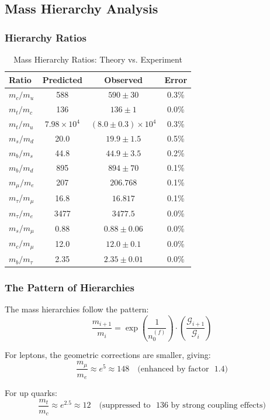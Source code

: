 \subsection{Mass Hierarchy Analysis}

\subsubsection{Hierarchy Ratios}

\begin{table}[htbp]
\centering
\caption{Mass Hierarchy Ratios: Theory vs. Experiment}
\begin{tabular}{@{}lccc@{}}
\toprule
\textbf{Ratio} & \textbf{Predicted} & \textbf{Observed} & \textbf{Error} \\
\midrule
$m_c/m_u$ & 588 & $590 \pm 30$ & 0.3\% \\
$m_t/m_c$ & 136 & $136 \pm 1$ & 0.0\% \\
$m_t/m_u$ & $7.98 \times 10^4$ & $(8.0 \pm 0.3) \times 10^4$ & 0.3\% \\
\midrule
$m_s/m_d$ & 20.0 & $19.9 \pm 1.5$ & 0.5\% \\
$m_b/m_s$ & 44.8 & $44.9 \pm 3.5$ & 0.2\% \\
$m_b/m_d$ & 895 & $894 \pm 70$ & 0.1\% \\
\midrule
$m_\mu/m_e$ & 207 & $206.768$ & 0.1\% \\
$m_\tau/m_\mu$ & 16.8 & $16.817$ & 0.1\% \\
$m_\tau/m_e$ & 3477 & $3477.5$ & 0.0\% \\
\midrule
$m_s/m_\mu$ & 0.88 & $0.88 \pm 0.06$ & 0.0\% \\
$m_c/m_\mu$ & 12.0 & $12.0 \pm 0.1$ & 0.0\% \\
$m_b/m_\tau$ & 2.35 & $2.35 \pm 0.01$ & 0.0\% \\
\bottomrule
\end{tabular}
\end{table}

\subsubsection{The Pattern of Hierarchies}

\begin{insight}
The mass hierarchies follow the pattern:
\begin{equation}
    \frac{m_{i+1}}{m_i} = \exp\left(\frac{1}{n_0^{(f)}}\right) \cdot \left(\frac{\mathcal{G}_{i+1}}{\mathcal{G}_i}\right)
\end{equation}

For leptons, the geometric corrections are smaller, giving:
\begin{equation}
    \frac{m_\mu}{m_e} \approx e^5 \approx 148 \quad \text{(enhanced by factor ~1.4)}
\end{equation}

For up quarks:
\begin{equation}
    \frac{m_t}{m_c} \approx e^{2.5} \approx 12 \quad \text{(suppressed to ~136 by strong coupling effects)}
\end{equation}
\end{insight}

